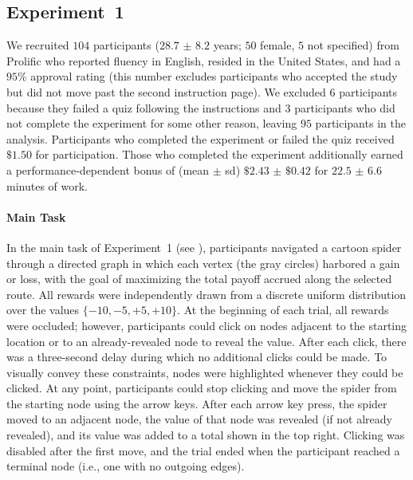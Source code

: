 \subsection{Experiment~1} \label{sec:planning-methods1}
We recruited $104$ participants ($28.7$ $\pm$ $8.2$ years; $50$ female, $5$ not specified) from Prolific who reported fluency in English, resided in the United States, and had a $95\%$ approval rating (this number excludes participants who accepted the study but did not move past the second instruction page). We excluded $6$ participants because they failed a quiz following the instructions and $3$ participants who did not complete the experiment for some other reason, leaving $95$ participants in the analysis. Participants who completed the experiment or failed the quiz received $\$1.50$ for participation. Those who completed the experiment additionally earned a performance-dependent bonus of (mean $\pm$ sd) $\$2.43$ $\pm$ $\$0.42$ for $22.5$ $\pm$ $6.6$ minutes of work.

\paragraph{Main Task}
In the main task of Experiment~1 (see ), participants navigated a cartoon spider through a directed graph in which each vertex (the gray circles) harbored a gain or loss, with the goal of maximizing the total payoff accrued along the selected route. All rewards were independently drawn from a discrete uniform distribution over the values $\{-10,-5, +5, +10\}$. At the beginning of each trial, all rewards were occluded; however, participants could click on nodes adjacent to the starting location or to an already-revealed node to reveal the value. After each click, there was a three-second delay during which no additional clicks could be made. To visually convey these constraints, nodes were highlighted whenever they could be clicked. At any point, participants could stop clicking and move the spider from the starting node using the arrow keys. After each arrow key press, the spider moved to an adjacent node, the value of that node was revealed (if not already revealed), and its value was added to a total shown in the top right. Clicking was disabled after the first move, and the trial ended when the participant reached a terminal node (i.e., one with no outgoing edges).



